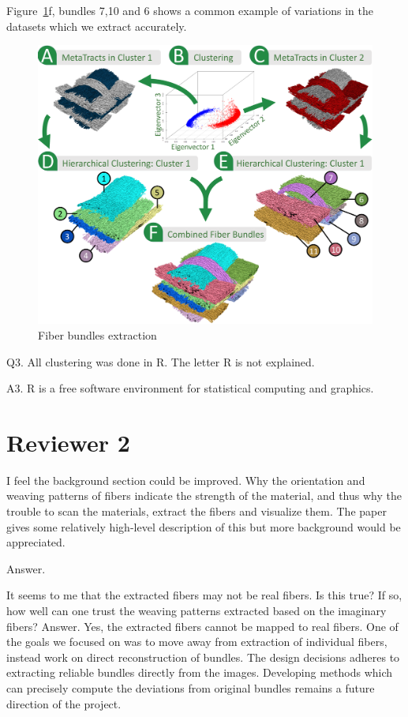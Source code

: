 \documentclass[]{article}
\begin{document}
Figure~\ref{fig:angle_bundles}f, bundles 7,10 and 6 shows a common example of variations in the datasets which we extract accurately. 
\begin{figure}
\centering
\includegraphics[width=0.7\linewidth]{images_pvis/clustering.pdf}
\caption{Fiber bundles extraction}
\label{fig:angle_bundles}
\end{figure}
  

\color{red}
Q3. All clustering was done in R. The letter R is not explained.
\color{black}

A3. R is a free software environment for statistical computing and graphics.

\section{Reviewer 2}
\color{red}
I feel the background section could be improved. Why the orientation and weaving patterns of fibers indicate the strength of the material, and thus why the trouble to scan the materials, extract the fibers and visualize them. The paper gives some relatively high-level description of this but more background would be appreciated.


\color{black}
Answer.

\color{red}
  It seems to me that the extracted fibers may not be real fibers. Is this
  true? If so, how well can one trust the weaving patterns extracted based
  on the imaginary fibers? 
  \color{black}
  Answer. 
Yes, the extracted fibers cannot be mapped to real fibers. One of the goals  we  focused on was to move away from extraction of individual fibers, instead work on direct reconstruction of bundles. The design decisions adheres to extracting reliable bundles directly from the images. 
 Developing methods which can precisely compute the deviations from original bundles remains a future direction of the project. 
\end{document}
